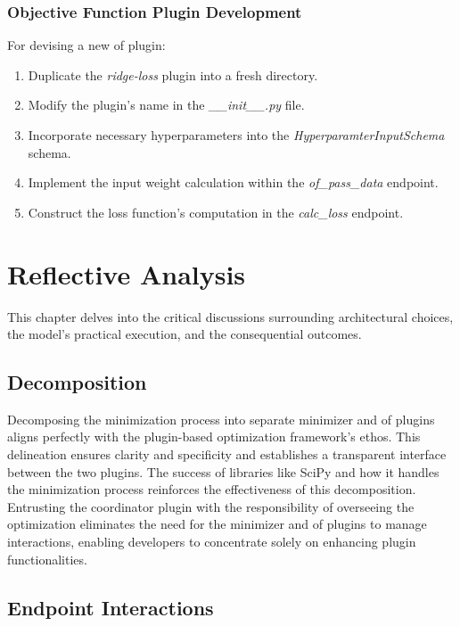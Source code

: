 \documentclass[
  a4paper,  %
  twoside,  %
  bibliography=totoc,
  headsepline,
  cleardoublepage=empty,
  parskip=half,
  draft=false
]{scrbook}
\begin{document}
\subsection{Objective Function Plugin Development}
\label{subsec:implementingAnObjectiveFunctionPlugin}

For devising a new \gls{of} plugin:

\begin{enumerate}
  \item Duplicate the \emph{ridge-loss} plugin into a fresh directory.
  \item Modify the plugin's name in the \emph{\_\_init\_\_.py} file.
  \item Incorporate necessary hyperparameters into the \emph{HyperparamterInputSchema} schema.
  \item Implement the input weight calculation within the \emph{of\_pass\_data} endpoint.
  \item Construct the loss function's computation in the \emph{calc\_loss} endpoint.
\end{enumerate}


\chapter{Reflective Analysis}
\label{chap:discussion}

This chapter delves into the critical discussions surrounding architectural choices, the model's practical execution, and the consequential outcomes.

\section{Decomposition}
\label{sec:decomposition}

Decomposing the minimization process into separate minimizer and \gls{of} plugins aligns perfectly with the plugin-based optimization framework's ethos.
This delineation ensures clarity and specificity and establishes a transparent interface between the two plugins.
The success of libraries like SciPy and how it handles the minimization process \cite{Virtanen2020} reinforces the effectiveness of this decomposition.
Entrusting the coordinator plugin with the responsibility of overseeing the optimization eliminates the need for the minimizer and \gls{of} plugins to manage interactions, enabling developers to concentrate solely on enhancing plugin functionalities.

\section{Endpoint Interactions}
\label{sec:enpointinteractions}
\end{document}
